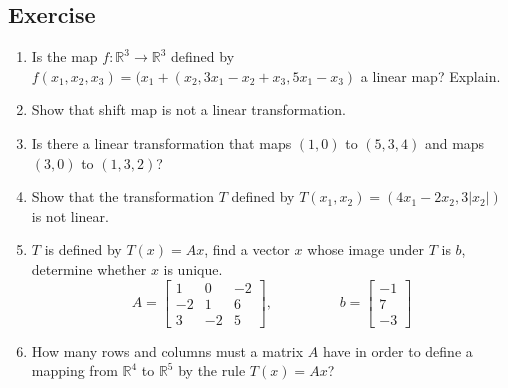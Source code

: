 \documentclass[aima104_lecturenotes_ku.tex]{subfiles}
\begin{document}
\subsection{Exercise}
\begin{enumerate}

\item Is the  map $f: \mathbb{R}^3 \to \mathbb{R}^3$ defined by $f(x_1,x_2,x_3)=(x_1+(x_2,3x_1-x_2+x_3,5x_1-x_3)$ a linear map? Explain.
\item Show that shift map is not a linear transformation.

\item Is there a linear transformation that maps $(1,0)$ to $(5,3,4)$ and maps $(3,0)$ to $(1,3,2)$?

\item Show that the transformation $T$ defined by $T(x_1,x_2)=(4x_1 - 2x_2, 3|x_2|)$ is not linear.
\item $T$ is defined by $T(x)=Ax$, find a vector $x$ whose image under $T$ is $b$, determine whether $x$ is unique.
  $$ A = \begin{bmatrix}
    1 & 0 & -2 \\
    -2 & 1 & 6 \\
    3 & -2 & 5
  \end{bmatrix}, \hspace{2cm}
  b= \begin{bmatrix}
    -1 \\ 7 \\ -3
  \end{bmatrix}
  $$

\item How many rows and columns must a matrix $A$ have in order to define a mapping from $\mathbb{R} ^4$ to $\mathbb{R} ^5$ by the rule $T(x) = Ax$?
\end{enumerate}
\end{document}
